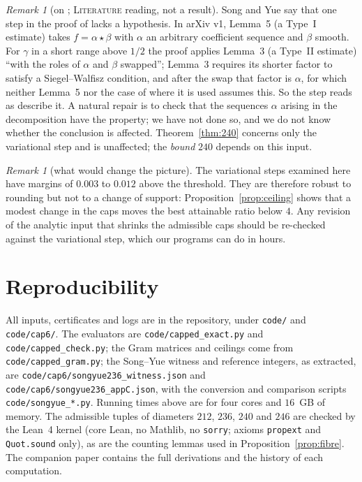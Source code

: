 \documentclass[11pt]{amsart}
\theoremstyle{definition}
\theoremstyle{remark}
\newtheorem{remark}[theorem]{Remark}
\newcommand{\lbl}[1]{\textup{\textsc{#1}}}
\begin{document}
\begin{remark}[on {\cite[Lemma~5]{Sta26}}; \lbl{Literature} reading, not a result]\label{rem:lemma5}
Song and Yue \cite[Remark~4.23]{SY26} say that one step in the proof of
\cite[Lemma~5]{Sta26} lacks a hypothesis. In arXiv v1, Lemma~5 (a Type~I
estimate) takes $f=\alpha\star\beta$ with $\alpha$ an arbitrary
coefficient sequence and $\beta$ smooth. For $\gamma$ in a short range above
$1/2$ the proof applies Lemma~3 (a Type~II estimate) ``with the roles of
$\alpha$ and $\beta$ swapped''; Lemma~3 requires its shorter factor to satisfy
a Siegel--Walfisz condition, and after the swap that factor is $\alpha$, for
which neither Lemma~5 nor the case of \cite[Definition~9]{Sta26} where it is
used assumes this. So the step reads as \cite{SY26} describe it. A natural
repair is to check that the sequences $\alpha$ arising in the decomposition
have the property; we have not done so, and we do not know whether the
conclusion is affected. Theorem~\ref{thm:240} concerns only the variational
step and is unaffected; the \emph{bound} $240$ depends on this input.
\end{remark}

\begin{remark}[what would change the picture]
The variational steps examined here have margins of $0.003$ to $0.012$ above
the threshold. They are therefore robust to rounding but not to a change of
support: Proposition~\ref{prop:ceiling} shows that a modest change in the caps
moves the best attainable ratio below $4$. Any revision of the analytic input
that shrinks the admissible caps should be re-checked against the variational
step, which our programs can do in hours.
\end{remark}

\section{Reproducibility}
All inputs, certificates and logs are in the repository, under
\texttt{code/} and \texttt{code/cap6/}. The evaluators are
\texttt{code/capped\_exact.py} and \texttt{code/capped\_check.py}; the Gram
matrices and ceilings come from \texttt{code/capped\_gram.py}; the Song--Yue
witness and reference integers, as extracted, are
\texttt{code/cap6/songyue236\_witness.json} and
\texttt{code/cap6/songyue236\_appC.json}, with the conversion and comparison
scripts \texttt{code/songyue\_*.py}. Running times above are for four cores
and $16$~GB of memory. The admissible tuples of diameters $212$, $236$, $240$
and $246$ are checked by the Lean~4 kernel (core Lean, no Mathlib, no
\texttt{sorry}; axioms \texttt{propext} and \texttt{Quot.sound} only), as are
the counting lemmas used in Proposition~\ref{prop:fibre}. The companion paper
\cite{Kim26} contains the full derivations and the history of each
computation.
\end{document}
